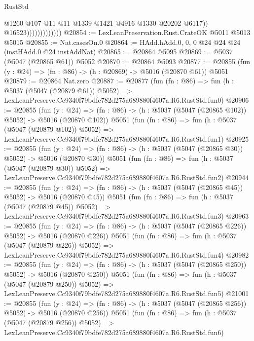 \begin{lexlean}{RustStd}
\begin{coremodule}
                                  @1260
                                  @107
                                  @11
                                  @11
                                  @1339
                                  @1421
                                  @4916
                                  @1330
                                  @20202
                                  @6117))
                              @16523)))))))))))))
@20854 := LexLeanPreservation.Rust.CrateOK @5011 @5013 @5015
@20855 := Nat.casesOn.{0}
@20864 := HAdd.hAdd.{0, 0, 0} @24 @24 @24 (instHAdd.{0} @24 instAddNat)
@20865 := @20864 @5095
@20869 := @5037 (@5047 (@20865 @61)) @5052
@20870 := @20864 @5093
@20877 := @20855 (fun (y : @24) => (fn : @86) -> (h : @20869) -> @5016 (@20870 @61)) @5051
@20879 := @20864 Nat.zero
@20887 := @20877
    (fun (fn : @86) =>
    fun (h : @5037 (@5047 (@20879 @61)) @5052) =>
    LexLeanPreserve.Cc9340f79bdfe782d275a689880f4607a.R6.RustStd.fun0)
@20906 := @20855
    (fun (y : @24) => (fn : @86) -> (h : @5037 (@5047 (@20865 @102)) @5052) -> @5016 (@20870 @102))
    @5051
    (fun (fn : @86) =>
    fun (h : @5037 (@5047 (@20879 @102)) @5052) =>
    LexLeanPreserve.Cc9340f79bdfe782d275a689880f4607a.R6.RustStd.fun1)
@20925 := @20855
    (fun (y : @24) => (fn : @86) -> (h : @5037 (@5047 (@20865 @30)) @5052) -> @5016 (@20870 @30))
    @5051
    (fun (fn : @86) =>
    fun (h : @5037 (@5047 (@20879 @30)) @5052) =>
    LexLeanPreserve.Cc9340f79bdfe782d275a689880f4607a.R6.RustStd.fun2)
@20944 := @20855
    (fun (y : @24) => (fn : @86) -> (h : @5037 (@5047 (@20865 @45)) @5052) -> @5016 (@20870 @45))
    @5051
    (fun (fn : @86) =>
    fun (h : @5037 (@5047 (@20879 @45)) @5052) =>
    LexLeanPreserve.Cc9340f79bdfe782d275a689880f4607a.R6.RustStd.fun3)
@20963 := @20855
    (fun (y : @24) => (fn : @86) -> (h : @5037 (@5047 (@20865 @226)) @5052) -> @5016 (@20870 @226))
    @5051
    (fun (fn : @86) =>
    fun (h : @5037 (@5047 (@20879 @226)) @5052) =>
    LexLeanPreserve.Cc9340f79bdfe782d275a689880f4607a.R6.RustStd.fun4)
@20982 := @20855
    (fun (y : @24) => (fn : @86) -> (h : @5037 (@5047 (@20865 @250)) @5052) -> @5016 (@20870 @250))
    @5051
    (fun (fn : @86) =>
    fun (h : @5037 (@5047 (@20879 @250)) @5052) =>
    LexLeanPreserve.Cc9340f79bdfe782d275a689880f4607a.R6.RustStd.fun5)
@21001 := @20855
    (fun (y : @24) => (fn : @86) -> (h : @5037 (@5047 (@20865 @256)) @5052) -> @5016 (@20870 @256))
    @5051
    (fun (fn : @86) =>
    fun (h : @5037 (@5047 (@20879 @256)) @5052) =>
    LexLeanPreserve.Cc9340f79bdfe782d275a689880f4607a.R6.RustStd.fun6)

\end{coremodule}
\end{lexlean}
